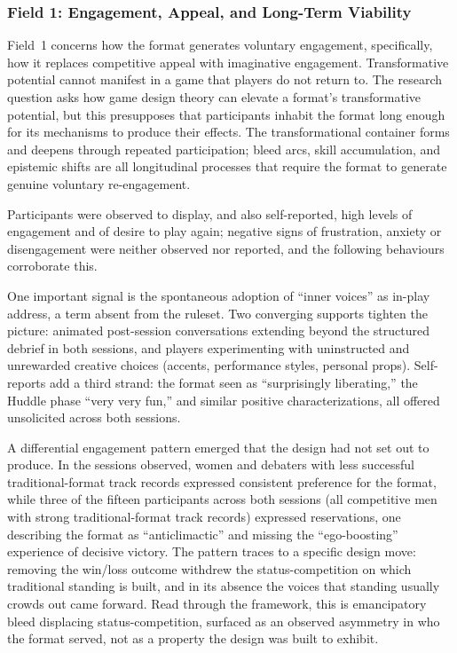 \subsubsection{Field 1: Engagement, Appeal, and Long-Term Viability}

Field~1 concerns how the format generates voluntary engagement, specifically, how it replaces competitive appeal with imaginative engagement. Transformative potential cannot manifest in a game that players do not return to. The research question asks how game design theory can elevate a format's transformative potential, but this presupposes that participants inhabit the format long enough for its mechanisms to produce their effects. The transformational container forms and deepens through repeated participation; bleed arcs, skill accumulation, and epistemic shifts are all longitudinal processes that require the format to generate genuine voluntary re-engagement.

Participants were observed to display, and also self-reported, high levels of engagement and of desire to play again; negative signs of frustration, anxiety or disengagement were neither observed nor reported, and the following behaviours corroborate this.

One important signal is the spontaneous adoption of ``inner voices'' as in-play address, a term absent from the ruleset. Two converging supports tighten the picture: animated post-session conversations extending beyond the structured debrief in both sessions, and players experimenting with uninstructed and unrewarded creative choices (accents, performance styles, personal props). Self-reports add a third strand: the format seen as ``surprisingly liberating,'' the Huddle phase ``very very fun,'' and similar positive characterizations, all offered unsolicited across both sessions.

A differential engagement pattern emerged that the design had not set out to produce. In the sessions observed, women and debaters with less successful traditional-format track records expressed consistent preference for the format, while three of the fifteen participants across both sessions (all competitive men with strong traditional-format track records) expressed reservations, one describing the format as ``anticlimactic'' and missing the ``ego-boosting'' experience of decisive victory. The pattern traces to a specific design move: removing the win/loss outcome withdrew the status-competition on which traditional standing is built, and in its absence the voices that standing usually crowds out came forward. Read through the framework, this is emancipatory bleed \parencite{kemper2017battle, kemper2020wyrding} displacing status-competition, surfaced as an observed asymmetry in who the format served, not as a property the design was built to exhibit.


